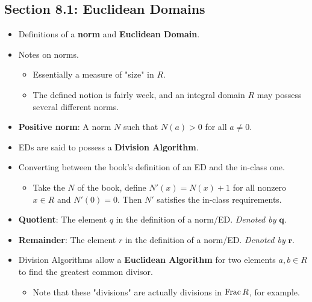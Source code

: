 \documentclass[../notes.tex]{subfiles}
\begin{document}
\subsection*{Section 8.1: Euclidean Domains}
\begin{itemize}
    \item Definitions of a \textbf{norm} and \textbf{Euclidean Domain}.
    \item Notes on norms.
    \begin{itemize}
        \item Essentially a measure of "size" in $R$.
        \item The defined notion is fairly week, and an integral domain $R$ may possess several different norms.
    \end{itemize}
    \item \textbf{Positive norm}: A norm $N$ such that $N(a)>0$ for all $a\neq 0$.
    \item EDs are said to possess a \textbf{Division Algorithm}.
    \item Converting between the book's definition of an ED and the in-class one.
    \begin{itemize}
        \item Take the $N$ of the book, define $N'(x)=N(x)+1$ for all nonzero $x\in R$ and $N'(0)=0$. Then $N'$ satisfies the in-class requirements.
    \end{itemize}
    \item \textbf{Quotient}: The element $q$ in the definition of a norm/ED. \emph{Denoted by} $\bm{q}$.
    \item \textbf{Remainder}: The element $r$ in the definition of a norm/ED. \emph{Denoted by} $\bm{r}$.
    \item {}Division Algorithms allow a \textbf{Euclidean Algorithm} for two elements $a,b\in R$ to find the greatest common divisor.
    \begin{itemize}
        \item Note that these "divisions" are actually divisions in $\operatorname{Frac} R$, for example.

\end{itemize}
\end{itemize}
\end{document}
